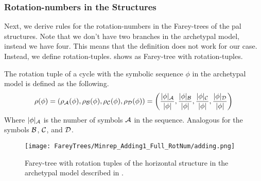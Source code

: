 \subsubsection{Rotation-numbers in the  Structures}

Next, we derive rules for the rotation-numbers in the Farey-trees of the \gls{pal} structures.
Note that we don't have two branches in the archetypal model, instead we have four.
This means that the definition  does not work for our case.
Instead, we define rotation-tuples.
 shows as Farey-tree with rotation-tuples.

\begin{definition}
	The rotation tuple of a cycle with the symbolic sequence $\phi$ in the archetypal model is defined as the following.
	\begin{align}
		\rho(\phi)
		= \left(\rho_{\mathcal{A}}(\phi), \rho_{\mathcal{B}}(\phi), \rho_{\mathcal{C}}(\phi), \rho_{\mathcal{D}}(\phi)\right)
		= \left(\dfrac{|\phi|_{\mathcal{A}}}{|\phi|}, \dfrac{|\phi|_{\mathcal{B}}}{|\phi|}, \dfrac{|\phi|_{\mathcal{C}}}{|\phi|}, \dfrac{|\phi|_{\mathcal{D}}}{|\phi|}\right)
	\end{align}
	Where $|\phi|_{\mathcal{A}}$ is the number of symbols $\mathcal{A}$ in the sequence.
	Analogous for the symbols $\mathcal{B}$, $\mathcal{C}$, and $\mathcal{D}$.
\end{definition}

\begin{figure}
	\centering
	\texttt{[image: FareyTrees/Minrep\_Adding1\_Full\_RotNum/adding.png]}
	\caption[Farey-tree with rotation tuples of the horizontal  structure in the archetypal model described in ]{
		Farey-tree with rotation tuples of the horizontal  structure in the archetypal model described in .
	}
	\label{fig:add.prop.rot.num.tree}
\end{figure}

